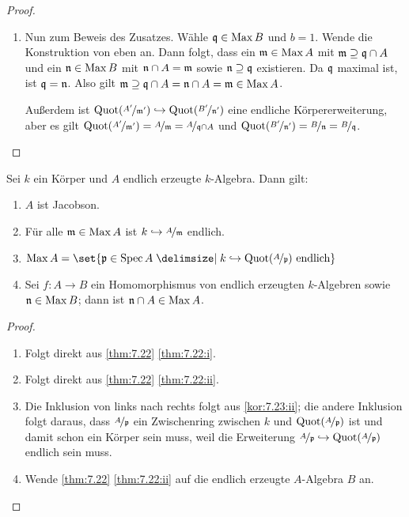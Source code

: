 \documentclass[12pt,a4paper]{scrartcl}
\theoremstyle{cplain}
\theoremstyle{cdef}
\begin{document}
\begin{proof}
\begin{enumerate}[label=\ref{thm:7.22:\roman*}]

		\item Nun zum Beweis des Zusatzes. Wähle $\mathfrak{q}\in\operatorname{Max} B$ und $b = 1$. Wende die Konstruktion von eben an. Dann folgt, dass ein $\mathfrak{m}\in\operatorname{Max} A$ mit $\mathfrak{m}\supseteq \mathfrak{q}\cap A$ und ein $\mathfrak{n}\in \operatorname{Max} B$ mit $\mathfrak{n}\cap A = \mathfrak{m}$ sowie $\mathfrak{n}\supseteq \mathfrak{q}$ existieren. Da $\mathfrak{q}$ maximal ist, ist $\mathfrak{q} = \mathfrak{n}$. Also gilt $\mathfrak{m}\supseteq \mathfrak{q}\cap A = \mathfrak{n}\cap A = \mathfrak{m}\in\operatorname{Max} A$. 

		Außerdem ist $\operatorname{Quot}(\nicefrac{A'}{\mathfrak{m}'})\hookrightarrow \operatorname{Quot}(\nicefrac{B'}{\mathfrak{n}'})$ eine endliche Körpererweiterung, aber es gilt $\operatorname{Quot}(\nicefrac{A'}{\mathfrak{m}'}) = \nicefrac{A}{\mathfrak{m}} = \nicefrac{A}{\mathfrak{q}\cap A}$ und $\operatorname{Quot}(\nicefrac{B'}{\mathfrak{n}'}) = \nicefrac{B}{\mathfrak{n}} = \nicefrac{B}{\mathfrak{q}}$.
		\qedhere
	\end{enumerate}
\end{proof}
\begin{kor} \label{kor:7.23}
	Sei $k$ ein Körper und $A$ endlich erzeugte $k$-Algebra. Dann gilt:
	\begin{enumerate}
		\item $A$ ist Jacobson. \label{kor:7.23:i}
		\item Für alle $\mathfrak{m}\in\operatorname{Max} A$ ist $k\hookrightarrow \nicefrac{A}{\mathfrak{m}}$ endlich. \label{kor:7.23:ii}
		\item $\Max A = \set{\fp\in\Spec A\given k\hookrightarrow \Quot(\fak A\fp) \text{ endlich}}$ \label{kor:7.23:iii}
		\item Sei $f\colon A \to B$ ein Homomorphismus von endlich erzeugten $k$-Algebren sowie $\mathfrak{n}\in\operatorname{Max} B$; dann ist $\mathfrak{n}\cap A \in\operatorname{Max} A$. \label{kor:7.23:iv}
	\end{enumerate}
\end{kor}
\begin{proof}
	\leavevmode
	\begin{enumerate}[label=\ref{kor:7.23:\roman*}]
		\item Folgt direkt aus \cref{thm:7.22} \ref{thm:7.22:i}.
		\item Folgt direkt aus \cref{thm:7.22} \ref{thm:7.22:ii}.
		\item Die Inklusion von links nach rechts folgt aus \ref{kor:7.23:ii}; die andere Inklusion folgt daraus, dass $\nicefrac{A}{\mathfrak{p}}$ ein Zwischenring zwischen $k$ und $\operatorname{Quot}(\nicefrac{A}{\mathfrak{p}})$ ist und damit schon ein Körper sein muss, weil die Erweiterung $\nicefrac{A}{\mathfrak{p}}\hookrightarrow \operatorname{Quot}(\nicefrac{A}{\mathfrak{p}})$ endlich sein muss.
		\item Wende \cref{thm:7.22} \ref{thm:7.22:ii} auf die endlich erzeugte $A$-Algebra $B$ an.
		\qedhere
	\end{enumerate}
\end{proof}
\end{document}
